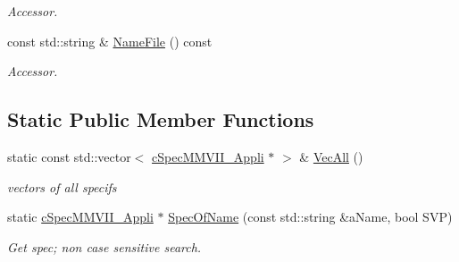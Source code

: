 \begin{DoxyCompactItemize}
\begin{DoxyCompactList}\small\item\em Accessor. \end{DoxyCompactList}\item 
const std\+::string \& \hyperlink{classMMVII_1_1cSpecMMVII__Appli_af18e2a2fc44607be31b6000fb05e8724}{Name\+File} () const \hypertarget{classMMVII_1_1cSpecMMVII__Appli_af18e2a2fc44607be31b6000fb05e8724}{}\label{classMMVII_1_1cSpecMMVII__Appli_af18e2a2fc44607be31b6000fb05e8724}

\begin{DoxyCompactList}\small\item\em Accessor. \end{DoxyCompactList}\end{DoxyCompactItemize}
\subsection*{Static Public Member Functions}
\begin{DoxyCompactItemize}
\item 
static const std\+::vector$<$ \hyperlink{classMMVII_1_1cSpecMMVII__Appli}{c\+Spec\+M\+M\+V\+I\+I\+\_\+\+Appli} $\ast$ $>$ \& \hyperlink{classMMVII_1_1cSpecMMVII__Appli_a820f1ee64ea3d56a04afff27073d8103}{Vec\+All} ()\hypertarget{classMMVII_1_1cSpecMMVII__Appli_a820f1ee64ea3d56a04afff27073d8103}{}\label{classMMVII_1_1cSpecMMVII__Appli_a820f1ee64ea3d56a04afff27073d8103}

\begin{DoxyCompactList}\small\item\em vectors of all specifs \end{DoxyCompactList}\item 
static \hyperlink{classMMVII_1_1cSpecMMVII__Appli}{c\+Spec\+M\+M\+V\+I\+I\+\_\+\+Appli} $\ast$ \hyperlink{classMMVII_1_1cSpecMMVII__Appli_ab1acaaf611652b94e61175eaa650b644}{Spec\+Of\+Name} (const std\+::string \&a\+Name, bool S\+VP)\hypertarget{classMMVII_1_1cSpecMMVII__Appli_ab1acaaf611652b94e61175eaa650b644}{}\label{classMMVII_1_1cSpecMMVII__Appli_ab1acaaf611652b94e61175eaa650b644}

\begin{DoxyCompactList}\small\item\em Get spec; non case sensitive search. \end{DoxyCompactList}\end{DoxyCompactItemize}
